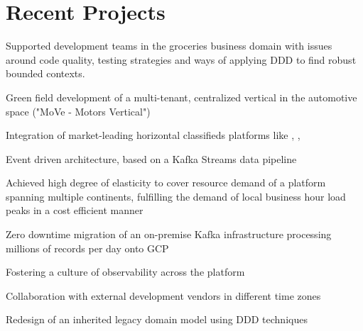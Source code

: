 \documentclass[]{resume}
\begin{document}
\hfill
\begin{minipage}[t]{0.64\textwidth} 


\section{Recent Projects}

\vspace{\topsep} %
Supported development teams in the groceries business domain with issues around code quality, testing strategies and ways of applying DDD to find robust bounded contexts.
\sectionsep

\vspace{\topsep} %
\begin{tightemize}
\item Green field development of a multi-tenant, centralized vertical in the automotive space ("MoVe - Motors Vertical")
\item Integration of market-leading horizontal classifieds platforms like \href{https://www.kijiji.ca}{}, \href{https://www.gumtree.com.au}{}, \href{https://www.gumtree.co.uk}{}
\item Event driven architecture, based on a Kafka Streams data pipeline
\item Achieved high degree of elasticity to cover resource demand of a platform spanning multiple continents, fulfilling the demand of local business hour load peaks in a cost efficient manner
\item Zero downtime migration of an on-premise Kafka infrastructure processing millions of records per day onto GCP
\item Fostering a culture of observability across the platform
\item Collaboration with external development vendors in different time zones
\item Redesign of an inherited legacy domain model using DDD techniques
\end{tightemize}
\sectionsep


\end{minipage}
\end{document}
